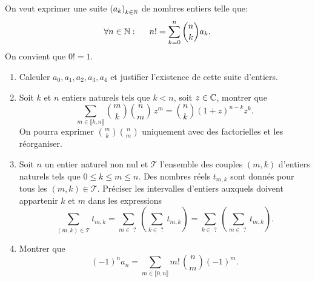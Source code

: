On veut exprimer une suite $\left( a_k\right)_{k\in \mathbb{N}}$ de nombres entiers telle que:
\begin{displaymath}
  \forall n \in \mathbb{N}:\hspace{0.5cm}
  n! = \sum_{k=0}^{n}\binom{n}{k}a_k .
\end{displaymath}
On convient que $0! = 1$.
\begin{enumerate}
  \item Calculer $a_0, a_1, a_2, a_3, a_4$ et justifier l'existence de cette suite d'entiers.
  \item Soit $k$ et $n$ entiers naturels tels que $k < n$, soit $z\in \mathbb{C}$, montrer que
\begin{displaymath}
  \sum_{m \in \llbracket k,n \rrbracket} \binom{m}{k}\binom{n}{m}\,z^m
  = \binom{n}{k}(1+z)^{n-k} z^{k} .
\end{displaymath}
On pourra exprimer $\binom{m}{k}\binom{n}{m}$ uniquement avec des factorielles et les réorganiser.

  \item Soit $n$ un entier naturel non nul et $\mathcal{T}$ l'ensemble des couples $(m,k)$ d'entiers naturels tels que $0\leq k \leq m \leq n$. Des nombres réels $t_{m,k}$ sont donnés pour tous les $(m,k)\in \mathcal{T}$. Préciser les intervalles d'entiers auxquels doivent appartenir $k$ et $m$ dans les expressions
  \begin{displaymath}
\sum_{(m,k)\in \mathcal{T}} t_{m,k}
= \sum_{m\in \text{ ? }} \left(\sum_{k\in \text{ ? }} t_{m,k}\right)
= \sum_{k\in \text{ ? }} \left(\sum_{m\in \text{ ? }} t_{m,k}\right) .
  \end{displaymath}
  \item Montrer que
\begin{displaymath}
  (-1)^n a_n = \sum_{m\in \llbracket 0,n \rrbracket}m!\,\binom{n}{m}(-1)^m .
\end{displaymath}

\end{enumerate}

 
